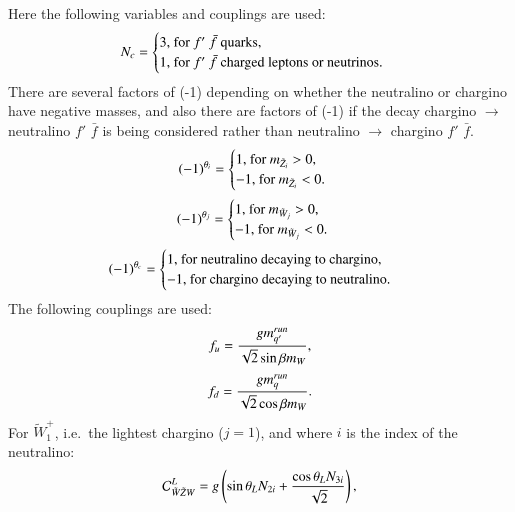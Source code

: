 \documentclass[final,3p,times]{elsarticle}
\begin{document}
Here the following variables and couplings are used:
\begin{equation}
N_{c} = \begin{cases}  3, $ for $f'$ $\bar{f}$ quarks, $\\
					   1, $ for $f'$ $\bar{f}$ charged leptons or neutrinos$. \\
						\end{cases}
\end{equation}
There are several factors of (-1) depending on whether the neutralino or chargino have negative masses, and also there are factors of (-1) if the decay chargino $\rightarrow$ neutralino $f'$ $\bar{f}$ is being considered rather than neutralino $\rightarrow$ chargino $f'$ $\bar{f}$.
\begin{equation}
(-1)^{\theta_i} = \begin{cases}	1, $ for $ m_{\tilde{Z}_i} > 0$,$ \\
								-1, $ for $ m_{\tilde{Z}_i} < 0. \\
								\end{cases}
\end{equation}
\begin{equation}
(-1)^{\theta_j} = \begin{cases}	1, $ for $ m_{\tilde{W}_j} > 0$,$ \\
								-1, $ for $m_{\tilde{W}_j} < 0. \\
								\end{cases}
\end{equation}
\begin{equation}
(-1)^{\theta_c} = \begin{cases} 1, $ for neutralino decaying to chargino, $\\
								-1, $ for chargino decaying to neutralino. $ \\
								\end{cases}
\end{equation}
The following couplings are used:
\begin{equation}
f_{u} = {g m_{q'}^{run} \over \sqrt{2} \sin\beta m_{W}},
\end{equation}
\begin{equation}
f_{d} = {g m_{q}^{run} \over \sqrt{2} \cos\beta m_{W}}.
\end{equation}
For $\tilde{W}^{+}_{1}$, i.e.\ the lightest chargino ($j = 1$), and where $i$ is the index of the neutralino:
\begin{equation}
\mathcal{C}_{\tilde{W} \tilde{Z} W}^L = g\left( \sin\theta_L N_{2i} +
  {\cos\theta_L N_{3i} \over \sqrt{2}} \right),
\end{equation}
\end{document}

